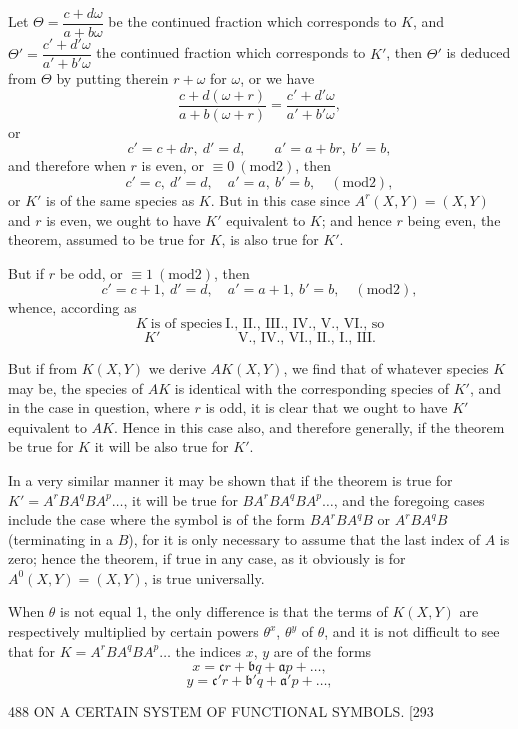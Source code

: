 \documentclass[11pt]{article}
\providecommand{\modd}{\mathrm{mod}}
\begin{document}
Let $\Theta=\dfrac{c+d\omega}{a+b\omega}$ be the continued fraction which corresponds to $K$, and $\Theta'=\dfrac{c'+d'\omega}{a'+b'\omega}$
the continued fraction which corresponds to $K'$, then $\Theta'$ is deduced from $\Theta$ by putting
therein $r+\omega$ for $\omega$, or we have
\[ \dfrac{c+d(\omega+r)}{a+b(\omega+r)}=\dfrac{c'+d'\omega}{a'+b'\omega}, \]
or
\[ c'=c+dr,\ d'=d,\qquad a'=a+br,\ b'=b, \]
and therefore when $r$ is even, or $\equiv 0\ (\modd 2)$, then
\[ c'=c,\ d'=d,\quad a'=a,\ b'=b,\quad (\modd 2), \]
or $K'$ is of the same species as $K$. But in this case since $A^{r}(X,Y)=(X,Y)$ and
$r$ is even, we ought to have $K'$ equivalent to $K$; and hence $r$ being even, the
theorem, assumed to be true for $K$, is also true for $K'$.

But if $r$ be odd, or $\equiv 1\ (\modd 2)$, then
\[ c'=c+1,\ d'=d,\quad a'=a+1,\ b'=b,\quad (\modd 2), \]
whence, according as
\[ K\ \text{is of species}\ \text{I., II., III., IV., V., VI., so} \]
\[ K'\ \phantom{\text{is of species}}\ \text{V., IV., VI., II., I., III.} \]

But if from $K(X,Y)$ we derive $AK(X,Y)$, we find that of whatever species $K$ may
be, the species of $AK$ is identical with the corresponding species of $K'$, and in the
case in question, where $r$ is odd, it is clear that we ought to have $K'$ equivalent to
$AK$. Hence in this case also, and therefore generally, if the theorem be true for $K$
it will be also true for $K'$.

In a very similar manner it may be shown that if the theorem is true for
$K'=A^{r}BA^{q}BA^{p}\ldots$, it will be true for $BA^{r}BA^{q}BA^{p}\ldots$, and the foregoing cases include
the case where the symbol is of the form $BA^{r}BA^{q}B$ or $A^{r}BA^{q}B$ (terminating in a $B$),
for it is only necessary to assume that the last index of $A$ is zero; hence the
theorem, if true in any case, as it obviously is for $A^{0}(X,Y)=(X,Y)$, is true
universally.

When $\theta$ is not equal 1, the only difference is that the terms of $K(X,Y)$ are
respectively multiplied by certain powers $\theta^{x}$, $\theta^{y}$ of $\theta$, and it is not difficult to see that
for $K=A^{r}BA^{q}BA^{p}\ldots$ the indices $x$, $y$ are of the forms
\[ x=\mathfrak{c}r+\mathfrak{b}q+\mathfrak{a}p+\ldots, \]
\[ y=\mathfrak{c}'r+\mathfrak{b}'q+\mathfrak{a}'p+\ldots, \]

\newpage
\begin{center}
488 \hfill ON A CERTAIN SYSTEM OF FUNCTIONAL SYMBOLS. \hfill \textsc{[293}
\end{center}
\end{document}
